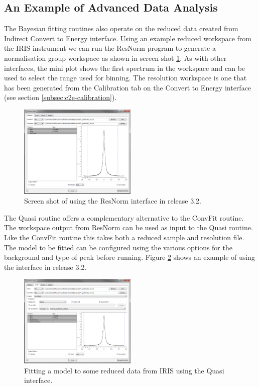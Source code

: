 \documentclass[paper=a4, fontsize=11pt]{scrartcl}	%
\numberwithin{equation}{section}															%
\numberwithin{figure}{section}																%
\numberwithin{table}{section}																%
\begin{document}
\subsection{An Example of Advanced Data Analysis}
The Bayesian fitting routines also operate on the reduced data created from Indirect Convert to Energy interface. Using an example reduced workspace from the IRIS instrument we can run the ResNorm program to generate a normalisation group workspace as shown in screen shot \ref{fig:iris-bayes-resnorm}. As with other interfaces, the mini plot shows the first spectrum in the workspace and can be used to select the range used for binning. The resolution workspace is one that has been generated from the Calibration tab on the Convert to Energy interface (see section \ref{subsec:c2e-calibration}).

\begin{figure}[H]
\centering
\includegraphics[width=0.5\textwidth]{img/iris-bayes-resnorm.png}
\caption{Screen shot of using the ResNorm interface in release 3.2.}
\label{fig:iris-bayes-resnorm}
\end{figure}

The Quasi routine offers a complementary alternative to the ConvFit routine. The workspace output from ResNorm can be used as input to the Quasi routine. Like the ConvFit routine this takes both a reduced sample and resolution file. The model to be fitted can be configured using the various options for the background and type of peak before running. Figure \ref{fig:iris-bayes-quasi} shows an example of using the interface in release 3.2.

\begin{figure}[H]
\centering
\includegraphics[width=0.5\textwidth]{img/iris-bayes-quasi.png}
\caption{Fitting a model to some reduced data from IRIS using the Quasi interface.}
\label{fig:iris-bayes-quasi}
\end{figure}
\end{document}
